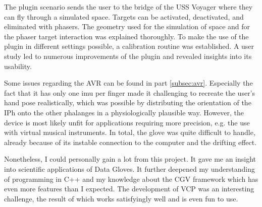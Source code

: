 \documentclass[hyperref, bachelorofscience]{cgvpub}
\begin{document}
The plugin scenario sends the user to the bridge of the USS Voyager where they can fly through a simulated space. Targets can be activated, deactivated, and eliminated with phasers. The geometry used for the simulation of space and for the phaser target interaction was explained thoroughly. To make the use of the plugin in different settings possible, a calibration routine was established. A user study led to numerous improvements of the plugin and revealed insights into its usability.

Some issues regarding the \Gls{AVR} can be found in part \ref{subsec:avr}. Especially the fact that it has only one \acrshort{imu} per finger made it challenging to recreate the user's hand pose realistically, which was possible by distributing the orientation of the \gls{IPh} onto the other phalanges in a physiologically plausible way. However, the device is most likely unfit for applications requiring more precision, e.g. the use with virtual musical instruments. In total, the glove was quite difficult to handle, already because of its instable connection to the computer and the drifting effect. 

Nonetheless, I could personally gain a lot from this project. It gave me an insight into scientific applications of Data Gloves. It  further deepened my understanding of programming in C++ and my knowledge about the \gls{CGV} framework which has even more features than I expected. The development of \gls{VCP} was an interesting challenge, the result of which works satisfyingly well and is even fun to use.

\printglossary[type=gloss_terms]
\printglossary[type=gloss_acr]
\end{document}
